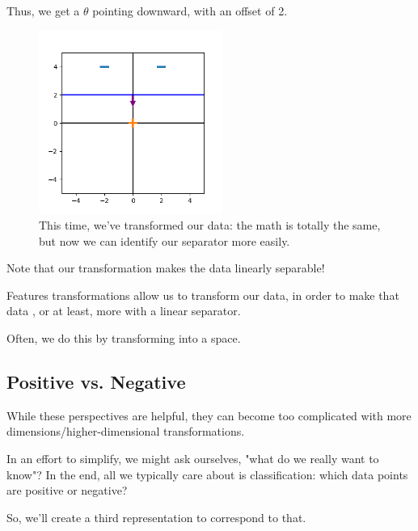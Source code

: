             Thus, we get a $\theta$ pointing downward, with an offset of 2.
    
            \begin{figure}[H]
                \centering
                \includegraphics[width=60mm,scale=0.5]{images/feature_images/nonlinear_data.png}
                \caption*{This time, we've transformed our data: the math is totally the same, but now we can identify our separator more easily.}
            \end{figure}
    
            Note that our transformation makes the data linearly separable!\\
    
            \begin{concept}
                Features transformations allow us to  transform our data, in order to make that data , or at least, more  with a linear separator.
    
                Often, we do this by transforming into a  space.
            \end{concept}
    
            \subsecdiv

        \subsection{Positive vs. Negative}

            While these perspectives are helpful, they can become too complicated with more dimensions/higher-dimensional transformations.

            In an effort to simplify, we might ask ourselves, "what do we really want to know"? In the end, all we typically care about is classification: which data points are positive or negative?

            So, we'll create a third representation to correspond to that.\\


